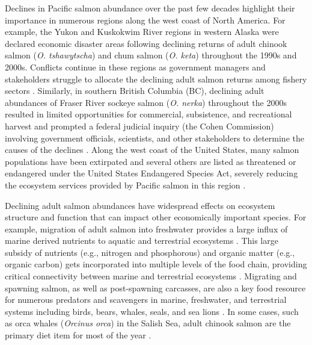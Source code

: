 Declines in Pacific salmon abundance over the past few decades highlight their
importance in numerous regions along the west coast of North America. For
example, the Yukon and Kuskokwim River regions in western Alaska were declared
economic disaster areas following declining returns of adult chinook salmon
(\emph{O. tshawytscha}) and chum salmon (\emph{O. keta}) throughout the 1990s
and 2000s. Conflicts continue in these regions as government managers and
stakeholders struggle to allocate the declining adult salmon returns among
fishery sectors \citep{Ebbin2002, Ebbin2003}. Similarly, in southern British
Columbia (BC), declining adult abundances of Fraser River sockeye salmon
(\emph{O. nerka}) throughout the 2000s resulted in limited opportunities for
commercial, subsistence, and recreational harvest and prompted a federal
judicial inquiry (the Cohen Commission) involving government officials,
scientists, and other stakeholders to determine the causes of the declines
\citep{Cohen2012}. Along the west coast of the United States, many salmon
populations have been extirpated and several others are listed as threatened or
endangered under the United States Endangered Species Act, severely reducing the
ecosystem services provided by Pacific salmon in this region \citep{Nehlsen1991,
NMFS2015, Williams2011b}.

Declining adult salmon abundances have widespread effects on ecosystem structure
and function that can impact other economically important species. For example,
migration of adult salmon into freshwater provides a large influx of marine
derived nutrients to aquatic and terrestrial ecosystems \citep{Claeson2006,
Johnston2004, Chaloner2002}. This large subsidy of nutrients (e.g., nitrogen and
phosphorous) and organic matter (e.g., organic carbon) gets incorporated into
multiple levels of the food chain, providing critical connectivity between
marine and terrestrial ecosystems \citep{Claeson2006, Johnston2004}. Migrating
and spawning salmon, as well as post-spawning carcasses, are also a key food
resource for numerous predators and scavengers in marine, freshwater, and
terrestrial systems including birds, bears, whales, seals, and sea lions
\citep{Ford2016, Olesiuk1993a, Trites2007a, Hilderbrand1999b}. In some cases,
such as orca whales (\emph{Orcinus orca}) in the Salish Sea, adult chinook
salmon are the primary diet item for most of the year \citep{Ford2016}.

